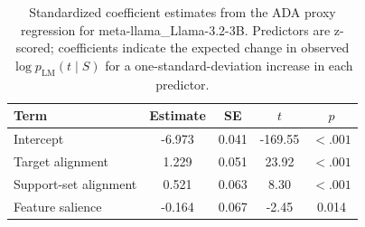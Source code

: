 \begin{table}

\caption{\label{tab:ada-coefficients-meta-llama-llama-3-2-3b}Standardized coefficient estimates from the ADA proxy regression for meta-llama_Llama-3.2-3B. Predictors are z-scored; coefficients indicate the expected change in observed $\log p_{\mathrm{LM}}(t \mid S)$ for a one-standard-deviation increase in each predictor.}
\centering
\begin{tabular}[t]{lcccc}
\toprule
Term & Estimate & SE & $t$ & $p$\\
\midrule
Intercept & -6.973 & 0.041 & -169.55 & $< .001$\\
Target alignment & 1.229 & 0.051 & 23.92 & $< .001$\\
Support-set alignment & 0.521 & 0.063 & 8.30 & $< .001$\\
Feature salience & -0.164 & 0.067 & -2.45 & 0.014\\
\bottomrule
\end{tabular}
\end{table}
